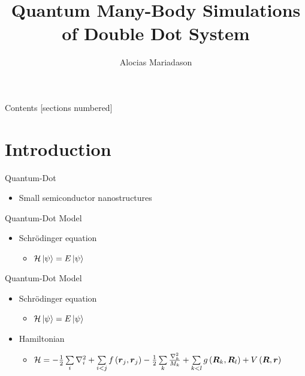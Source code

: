 \documentclass[10pt, t, xcolor=dvipsnames]{beamer}
\title{Quantum Many-Body Simulations of Double Dot System}
\date{}
\author{Alocias Mariadason}
\institute{}
\begin{document}
\maketitle

\begin{frame}{Contents}
  [sections numbered]
  \tableofcontents[hideallsubsections]
\end{frame}

\section{Introduction}

\begin{frame}[fragile]{Quantum-Dot}
    \begin{itemize}
        \item Small semiconductor nanostructures
    \end{itemize}
\end{frame}

\begin{frame}[fragile]{Quantum-Dot Model}
    \begin{itemize}
        \item Schrödinger equation 
            \begin{itemize}
                \item $\mathcal{H}\ket{\psi} = E\ket{\psi}$
            \end{itemize}
    \end{itemize}
\end{frame}

\begin{frame}[fragile]{Quantum-Dot Model}
    \begin{itemize}
        \item Schrödinger equation 
            \begin{itemize}
                \item $\mathcal{H}\ket{\psi} = E\ket{\psi}$
            \end{itemize}
        \item Hamiltonian
            \begin{itemize}
                \item $\mathcal{H} = - \frac{1}{2} \sum\limits_i \nabla^2_i +
                    \sum\limits_{i<j} f\left(\bm{{r}}_j, \bm{{r}}_j\right) -
                    \frac{1}{2} \sum\limits_k \frac{\nabla^2_k}{M_k} + \sum\limits_{k<l}
                    g\left(\bm{{R}}_k,\bm{{R}}_l\right) +
                    V\left(\bm{{R}},\bm{{r}}\right)$
            \end{itemize}
    \end{itemize}
\end{frame}
\end{document}
